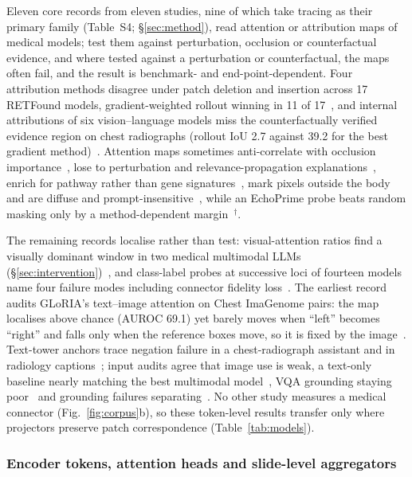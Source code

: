 Eleven core records from eleven studies, nine of which take tracing as their primary family
(Table~S4; \S\ref{sec:method}), read attention or attribution maps of medical models; \Vtrany{} test them against
perturbation, occlusion or counterfactual evidence, and where tested against a perturbation or counterfactual, the maps often fail, and the result is benchmark- and end-point-dependent. Four attribution methods disagree under patch deletion and insertion across 17 RETFound
models, gradient-weighted rollout winning in 11 of 17~\cite{bors2026benchmarking}, and internal
attributions of six vision--language models miss the counterfactually verified evidence region on
chest radiographs (rollout IoU 2.7 against 39.2 for the best gradient
method)~\cite{xiong2026rethinking}. Attention maps sometimes anti-correlate with occlusion
importance~\cite{sadanandan2026attention}, lose to perturbation and relevance-propagation
explanations~\cite{idaji2026beyond}, enrich for pathway rather than gene
signatures~\cite{srikanthan2026do}, mark pixels outside the body~\cite{hashmi2024towards} and are
diffuse and prompt-insensitive~\cite{injarabian2025interpreting}, while an EchoPrime probe beats
random masking only by a method-dependent margin~\cite{akanova2026interpreting}$^{\dagger}$.

The remaining records localise rather than test: visual-attention ratios find a visually dominant
window in two medical multimodal LLMs (\S\ref{sec:intervention})~\cite{chen2026vihd}, and
class-label probes at successive loci of fourteen models name four failure modes including connector
fidelity loss~\cite{zhu2026lost}. The earliest record audits GLoRIA's text--image attention on Chest
ImaGenome pairs: the map localises above chance (AUROC 69.1) yet barely moves when ``left'' becomes
``right'' and falls only when the reference boxes move, so it is fixed by the
image~\cite{mcinerney2022that}. Text-tower anchors trace negation failure in a chest-radiograph
assistant and in radiology captions~\cite{vu2025improving,abbasi2026layerspecific}; input audits
agree that image use is weak, a text-only baseline nearly matching the best multimodal
model~\cite{lotfinia2026vision}, VQA grounding staying poor~\cite{chen2026grounding} and grounding
failures separating~\cite{liu2026medical}. No other study measures a medical connector
(Fig.~\ref{fig:corpus}b), so these token-level results transfer only where projectors preserve patch
correspondence (Table~\ref{tab:models}).

\subsubsection{Encoder tokens, attention heads and slide-level aggregators}


